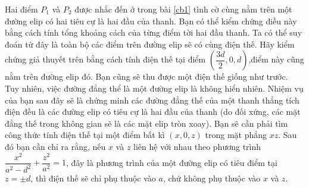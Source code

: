     
    \begin{vd}
    Hai điểm $P_1$ và $P_2$ được nhắc đến ở trong bài \ref{cb1} tình cờ cùng nằm trên một đường elip có hai tiêu cự là hai đầu của thanh. Bạn có thể kiểm chứng điều này bằng cách tính tổng khoảng cách của từng điểm tời hai đầu thanh. Ta có thể suy đoán từ đây là toàn bộ các điểm trên đường elip sẽ có cùng điện thế. Hãy kiểm chứng giả thuyết trên bằng cách tính điện thế tại điểm $(\dfrac{3d}{2},0,d)$,điểm này cũng nằm trên đường elip đó. Bạn cũng sẽ thu được một điện thế giống như trước. Tuy nhiên, việc đường đẳng thể là một đường elip là không hiển nhiên. Nhiệm vụ của bạn sau đây sẽ là chứng minh các đường đẳng thế của một thanh thẳng tích điện đều là các đường elip có tiêu cự là hai đầu của thanh (do đối xứng, các mặt đẳng thế trong không gian sẽ là các mặt elip tròn xoay). Bạn sẽ cần phải tìm công thức tính điện thế tại một điểm bất kì $(x,0,z)$ trong mặt phẳng $xz$. Sau đó bạn cần chỉ ra rằng, nếu $x$ và $z$ liên hệ với nhau theo phương trình $\dfrac{x^2}{a^2-d^2}+\dfrac{z^2}{a^2}=1$, đây là phương trình của một đường elip có tiêu điểm tại $z=\pm d$, thì điện thế sẽ chỉ phụ thuộc vào $a$, chứ không phụ thuộc vào $x$ và $z$.
    \end{vd}
